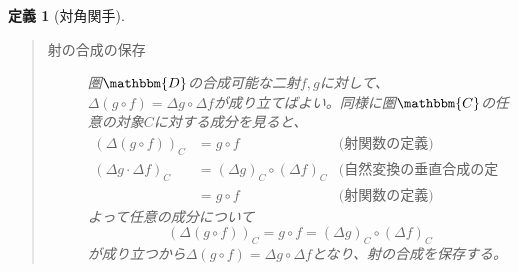 \documentclass[uplatex,dvipdfmx]{jsarticle}
\newcommand{\cat}[1]{\mathbbm{#1}}
\newtheorem{define}{定義}[section]
\numberwithin{proof}{subsection}
\numberwithin{prop}{subsection}
\numberwithin{define}{subsection}
\begin{document}
\begin{define}[対角関手]
\begin{quote}
\begin{description}
				\item[射の合成の保存] 圏$\cat{D}$の合成可能な二射$f,g$に対して、$\varDelta(g\circ f)=\varDelta g\circ \varDelta f$が成り立てばよい。同様に圏$\cat{C}$の任意の対象$C$に対する成分を見ると、
        \begin{align*}
          (\varDelta(g\circ f))_C&=g\circ f&\text{(射関数の定義)}\\
          (\varDelta g\cdot\varDelta f)_C &= (\varDelta g)_C\circ (\varDelta f)_C&\text{(自然変換の垂直合成の定義)}\\
          &=g\circ f&\text{(射関数の定義)}
        \end{align*}
        よって任意の成分について\[(\varDelta(g\circ f))_C=g\circ f=(\varDelta g)_C\circ (\varDelta f)_C\]が成り立つから$\varDelta(g\circ f)=\varDelta g\circ \varDelta f$となり、射の合成を保存する。
			\end{description}
		\end{quote}
  \end{define}
\end{document}
